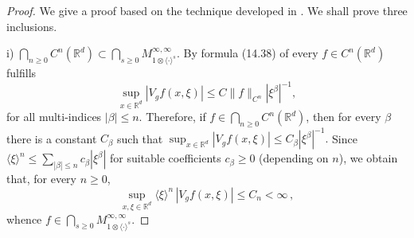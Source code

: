 \documentclass[12pt]{amsart}
\theoremstyle{definition}
\theoremstyle{remark}
\numberwithin{equation}{section}
\def\bR{{\mathbb{R}}}
\def\rd{\bR^d}
\newcommand{\lan}{\langle}
\newcommand{\ran}{\rangle}
\begin{document}
\begin{proof}  We give a proof based on the technique
  developed in \cite{book}. We  shall prove three inclusions.

i) $\bigcap _{n\geq 0} C^n (\rd )   \subset
\bigcap_{s\ge0}M^{\infty,\infty}_{1\otimes\lan\cdot\ran^s}$. By
formula (14.38) of \cite{book} every  $f\in C^n(\rd)$ fulfills 
\[
\sup_{x\in\rd}|V_gf(x,\xi)|\le C \|f\|_{C^n} |\xi^\beta|^{-1},
\]
for all multi-indices  $|\beta|\le n$. Therefore, if
$f\in\bigcap_{n\ge0}C^n(\rd)$, then for every $\beta$ there is a
constant $C_\beta$ such that $ \sup_{x\in\rd}|V_gf(x,\xi)|\le C_\beta
|\xi^\beta|^{-1}.$ 
Since $\langle \xi \rangle ^n \leq \sum _{|\beta   | \leq n}
c_\beta
|\xi ^\beta |$ for suitable coefficients $c_\beta \geq 0$
(depending
on $n$), we obtain that, for every $n\geq 0$,
\begin{equation}
  \label{eq:hh2}
  \sup _{x,\xi \in \rd } \langle \xi \rangle ^n \, |V_g f (x,\xi )|
  \leq C_n <\infty \, ,
\end{equation}
whence $f \in
\bigcap_{s\ge0}M^{\infty,\infty}_{1\otimes\lan\cdot\ran^s}$.





\end{proof}
\end{document}
